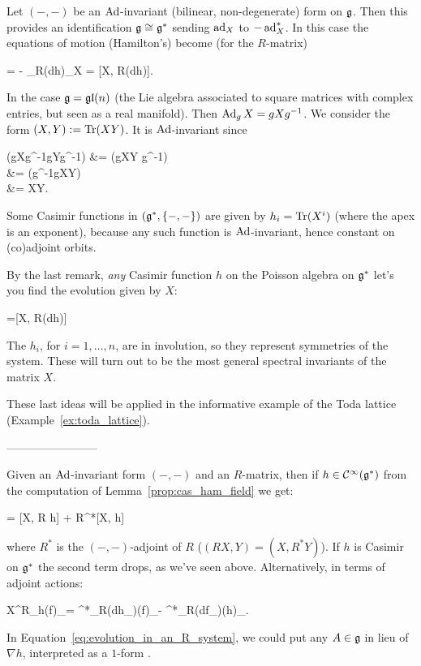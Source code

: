 \documentclass[main.tex]{subfiles}
\begin{document}
\begin{remark}
	Let $(-,-)$ be an $\operatorname{Ad}$-invariant (bilinear, non-degenerate) form on $\mathfrak g$. Then this provides an identification $\mathfrak g \overset{}{\cong} \mathfrak g^*$ sending $\operatorname{ad}_X$ to $-\operatorname{ad}^*_X$. In this case the equations of motion (Hamilton's) become (for the $R$-matrix)
	\begin{eqalign}
		 = - \ad_{R(dh)}\vert_X = [X, R(dh)].
	\end{eqalign}
\end{remark}

\begin{example}
	In the case $\mathfrak g = \mathfrak{gl}(n)$ (the Lie algebra associated to square matrices with complex entries, but seen as a real manifold). Then $\operatorname{Ad}_g X = gXg^{-1}$. We consider the form $(X,Y) := \operatorname{Tr}(XY)$. It is $\operatorname{Ad}$-invariant since
	\begin{eqalign}
		\trace (gXg^{-1}gYg^{-1}) &= \trace (gXY g^{-1})\\
			&= \trace (g^{-1}gXY) \comment{b.c. trace is cyclic-invariant}\\
			&= \trace XY.
	\end{eqalign}
	Some Casimir functions in $(\mathfrak g^*, \{-,-\})$ are given by $h_i = \operatorname{Tr} (X^i)$ (where the apex is an exponent), because any such function is $\operatorname{Ad}$-invariant, hence constant on (co)adjoint orbits.

	By the last remark, \emph{any} Casimir function $h$ on the Poisson algebra on $\mathfrak g^*$ let's you find the evolution given by $X$:
	\begin{eqalign}
		 =[X, R(dh)]
	\end{eqalign}
	The $h_i$, for $i=1,\ldots,n$, are in involution, so they represent symmetries of the system. These will turn out to be the most general spectral invariants of the matrix $X$.
\end{example}

These last ideas will be applied in the informative example of the Toda lattice (Example~\ref{ex:toda_lattice}).

\begin{center}
	------------------------
\end{center}

Given an $\operatorname{Ad}$-invariant form $(-,-)$ and an $R$-matrix, then if $h \in \mathcal{C}^\infty(\mathfrak g^*)$ from the computation of Lemma~\ref{prop:cas_ham_field} we get:
\begin{eqalign}
\label{eq:evolution_in_an_R_system}
	 = [X, R \nabla h] + R^*[X, \nabla h]
\end{eqalign}
where $R^*$ is the $(-,-)$-adjoint of $R$ ($(RX, Y) = (X, R^*Y)$). If $h$ is Casimir on $\mathfrak g^*$ the second term drops, as we've seen above. Alternatively, in terms of adjoint actions:
\begin{eqalign}
	X^R_h(f)\vert_\alpha = \ad^*_{R(dh\vert_\alpha)}(f)\vert_\alpha - \ad^*_{R(df\vert_\alpha)}(h)\vert_\alpha.
\end{eqalign}
In Equation~\eqref{eq:evolution_in_an_R_system}, we could put any $A \in \mathfrak g$ in lieu of $\nabla h$, interpreted as a $1$-form \what.
\end{document}

